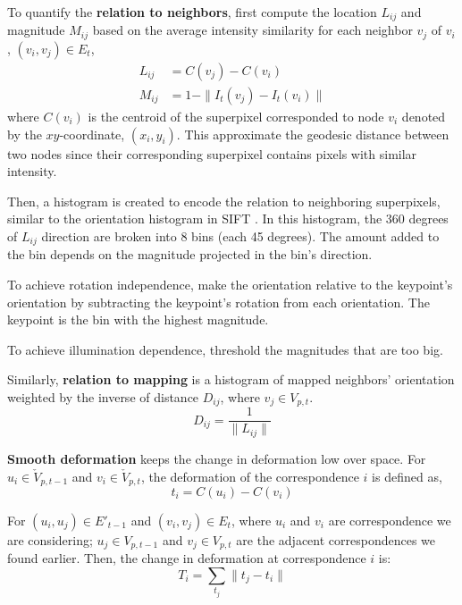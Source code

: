 \documentclass[10pt,letterpaper]{article}
\begin{document}
To quantify the \textbf{relation to neighbors}, first compute the location $L_{ij}$ and magnitude $M_{ij}$ based on the average intensity similarity for each neighbor $v_j$ of $v_i$, $(v_i, v_j) \in E_t$,
\begin{equation}
\begin{aligned}
L_{ij} & = C(v_j) - C(v_i) \\
M_{ij} & = 1 - \| I_t(v_j) - I_t(v_i) \|
\end{aligned}
\end{equation}
where $C(v_i)$ is the centroid of the superpixel corresponded to node $v_i$ denoted by the $xy$-coordinate, $(x_i, y_i)$. This approximate the geodesic distance between two nodes since their corresponding superpixel contains pixels with similar intensity.

Then, a histogram is created to encode the relation to neighboring superpixels, similar to the orientation histogram in SIFT \cite{lowe1999}. In this histogram, the 360 degrees of $L_{ij}$ direction are broken into 8 bins (each 45 degrees). The amount added to the bin depends on the magnitude projected in the bin's direction.

To achieve rotation independence, make the orientation relative to the keypoint's orientation by subtracting the keypoint's rotation from each orientation. The keypoint is the bin with the highest magnitude.

To achieve illumination dependence, threshold the magnitudes that are too big.

Similarly, \textbf{relation to mapping} is a histogram of mapped neighbors' orientation weighted by the inverse of distance $D_{ij}$, where $v_j \in V_{p,t}$.
\begin{equation}
D_{ij} = \frac{1}{ \| L_{ij} \| }
\end{equation}

\textbf{Smooth deformation} keeps the change in deformation low over space. For $u_i \in \check{V}_{p,t-1}$ and $v_i \in \check{V}_{p,t}$, the deformation of the correspondence $i$ is defined as,
\begin{equation}
t_i = C(u_i) - C(v_i)
\end{equation}

For $(u_i, u_j) \in E'_{t-1}$ and $(v_i, v_j) \in E_t$, where $u_i$ and $v_i$ are correspondence we are considering; $u_j \in V_{p,t-1}$ and $v_j \in  V_{p,t}$ are the adjacent correspondences we found earlier. Then, the change in deformation at correspondence $i$ is:
\begin{equation}
T_i = \sum_{t_j} \| t_j - t_i \|
\end{equation}
\end{document}
